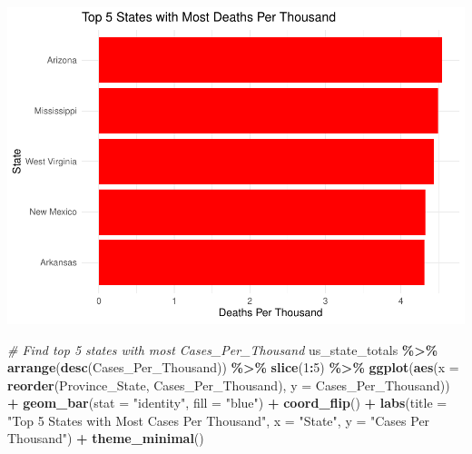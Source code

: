 \documentclass[
]{article}
\newenvironment{Shaded}{\begin{snugshade}}{\end{snugshade}}
\newcommand{\AttributeTok}[1]{\textcolor[rgb]{0.13,0.29,0.53}{#1}}
\newcommand{\CommentTok}[1]{\textcolor[rgb]{0.56,0.35,0.01}{\textit{#1}}}
\newcommand{\DecValTok}[1]{\textcolor[rgb]{0.00,0.00,0.81}{#1}}
\newcommand{\FunctionTok}[1]{\textcolor[rgb]{0.13,0.29,0.53}{\textbf{#1}}}
\newcommand{\NormalTok}[1]{#1}
\newcommand{\SpecialCharTok}[1]{\textcolor[rgb]{0.81,0.36,0.00}{\textbf{#1}}}
\newcommand{\StringTok}[1]{\textcolor[rgb]{0.31,0.60,0.02}{#1}}
\begin{document}
\includegraphics{covid-data-analysis_files/figure-latex/us-per-thousand-1.pdf}

\begin{Shaded}
\begin{Highlighting}[]
\CommentTok{\# Find top 5 states with most Cases\_Per\_Thousand}
\NormalTok{us\_state\_totals }\SpecialCharTok{\%\textgreater{}\%}
  \FunctionTok{arrange}\NormalTok{(}\FunctionTok{desc}\NormalTok{(Cases\_Per\_Thousand)) }\SpecialCharTok{\%\textgreater{}\%}
  \FunctionTok{slice}\NormalTok{(}\DecValTok{1}\SpecialCharTok{:}\DecValTok{5}\NormalTok{) }\SpecialCharTok{\%\textgreater{}\%}
  \FunctionTok{ggplot}\NormalTok{(}\FunctionTok{aes}\NormalTok{(}\AttributeTok{x =} \FunctionTok{reorder}\NormalTok{(Province\_State, Cases\_Per\_Thousand), }\AttributeTok{y =}\NormalTok{ Cases\_Per\_Thousand)) }\SpecialCharTok{+}
  \FunctionTok{geom\_bar}\NormalTok{(}\AttributeTok{stat =} \StringTok{"identity"}\NormalTok{, }\AttributeTok{fill =} \StringTok{"blue"}\NormalTok{) }\SpecialCharTok{+}
  \FunctionTok{coord\_flip}\NormalTok{() }\SpecialCharTok{+}
  \FunctionTok{labs}\NormalTok{(}\AttributeTok{title =} \StringTok{"Top 5 States with Most Cases Per Thousand"}\NormalTok{,}
       \AttributeTok{x =} \StringTok{"State"}\NormalTok{,}
       \AttributeTok{y =} \StringTok{"Cases Per Thousand"}\NormalTok{) }\SpecialCharTok{+}
  \FunctionTok{theme\_minimal}\NormalTok{()}
\end{Highlighting}
\end{Shaded}
\end{document}
